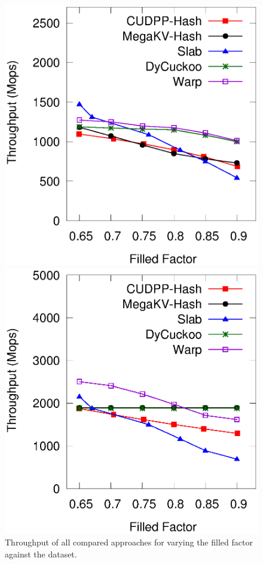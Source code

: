 %
\begin{figure}[t]
	\begin{minipage}{0.48\linewidth}\centering
		\includegraphics[width=\linewidth]{pic/static-load_factor/random/insert.eps}
		\centerline{}
	\end{minipage}
	\begin{minipage}{0.48\linewidth}\centering
		\includegraphics[width=\linewidth]{pic/static-load_factor/random/search.eps}
		\centerline{}
	\end{minipage}
	\caption{Throughput of all compared approaches for varying the filled factor against the \dsrandom dataset.}
	\label{fig:static-filled-factor}
\end{figure}

